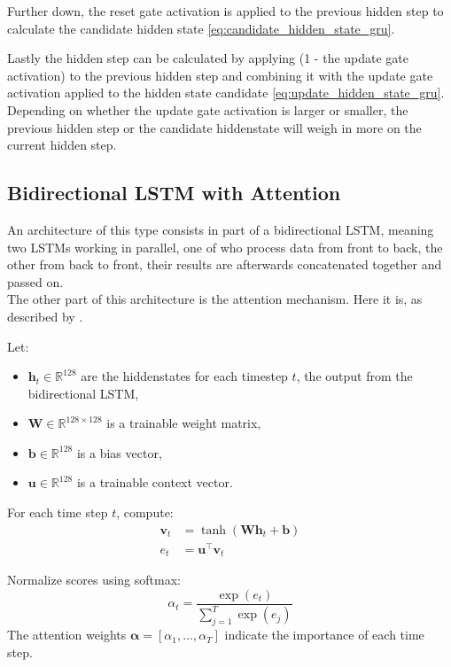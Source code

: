 \documentclass{article}
\begin{document}
Further down, the reset gate activation is applied to the previous hidden step 
to calculate the candidate hidden state \eqref{eq:candidate_hidden_state_gru}. 

Lastly the hidden step can be calculated by applying (1 - the update gate 
activation) to the previous hidden step and combining it with the update gate 
activation applied to the hidden state candidate \eqref{eq:update_hidden_state_gru}. 
Depending on whether the update gate activation is larger or smaller, the 
previous hidden step or the candidate hiddenstate will weigh in more on the 
current hidden step.

\subsection{Bidirectional LSTM with Attention}

An architecture of this type consists in part of a bidirectional LSTM, meaning 
two LSTMs working in parallel, one of who process data from front to back, the 
other from back to front, their results are afterwards concatenated together 
and passed on.
\\[2em]
The other part of this architecture is the attention mechanism. Here it is, as 
described by \cite{bahdanau2016neuralmachinetranslationjointly}.

Let:
\begin{itemize}
    \item $\mathbf{h}_t \in \mathbb{R}^{128}$ are the hiddenstates for each 
    timestep $t$, the output from the bidirectional LSTM,
    \item $\mathbf{W} \in \mathbb{R}^{128 \times 128}$ is a trainable weight 
    matrix,
    \item $\mathbf{b} \in \mathbb{R}^{128}$ is a bias vector,
    \item $\mathbf{u} \in \mathbb{R}^{128}$ is a trainable context vector.
\end{itemize}

For each time step $t$, compute:
\begin{align}
    \mathbf{v}_t &= \tanh\!\left( \mathbf{W} \mathbf{h}_t + \mathbf{b} \right) \label{eq:v_bahdanau} \\
    e_t &= \mathbf{u}^\top \mathbf{v}_t \label{eq:attention_score}
\end{align}

Normalize scores using softmax:
\begin{equation}
    \alpha_t = \frac{\exp(e_t)}{\sum_{j=1}^{T} \exp(e_j)} \label{eq:alpha_score}
\end{equation}
The attention weights $\boldsymbol{\alpha} = [\alpha_1, \dots, \alpha_T]$ 
indicate the importance of each time step.
\end{document}

